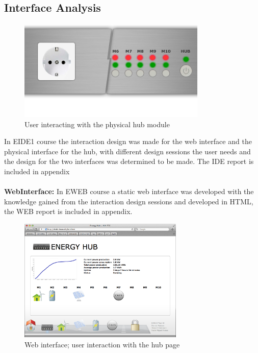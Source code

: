 \subsection{Interface Analysis}
\begin{figure}[H]
	\begin{centering}
		 \includegraphics[width=0.8\textwidth]{images/hub_user_interact.png}
		\caption{User interacting with the physical hub module}
	\end{centering}
\end{figure}
In EIDE1 course the interaction design was made for the web interface and the physical interface for the hub, with different design sessions the user needs and the design for the two interfaces was determined to be made. The IDE report is included in appendix\\
\\\textbf{WebInterface:} In EWEB course a static web interface was developed with the knowledge gained from the interaction design sessions and developed in HTML, the WEB report is included in appendix.
\begin{figure}[H]
	\begin{centering}
		 \includegraphics[width=0.7\textwidth]{images/screen_hub_page.png}
		\caption{Web interface; user interaction with the hub page}
 	\end{centering}
\end{figure}
